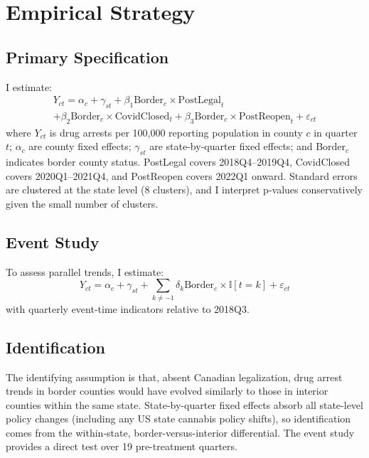 \documentclass[12pt]{article}
\newcommand{\ind}{\mathbb{I}}
\begin{document}



\section{Empirical Strategy}
\label{sec:strategy}

\subsection{Primary Specification}

I estimate:
\begin{multline}
Y_{ct} = \alpha_c + \gamma_{st} + \beta_1 \text{Border}_c \times \text{PostLegal}_t \\
+ \beta_2 \text{Border}_c \times \text{CovidClosed}_t + \beta_3 \text{Border}_c \times \text{PostReopen}_t + \varepsilon_{ct}
\label{eq:main}
\end{multline}
where $Y_{ct}$ is drug arrests per 100,000 reporting population in county $c$ in quarter $t$; $\alpha_c$ are county fixed effects; $\gamma_{st}$ are state-by-quarter fixed effects; and $\text{Border}_c$ indicates border county status. PostLegal covers 2018Q4--2019Q4, CovidClosed covers 2020Q1--2021Q4, and PostReopen covers 2022Q1 onward. Standard errors are clustered at the state level (8 clusters), and I interpret p-values conservatively given the small number of clusters.

\subsection{Event Study}

To assess parallel trends, I estimate:
\begin{equation}
Y_{ct} = \alpha_c + \gamma_{st} + \sum_{k \neq -1} \delta_k \text{Border}_c \times \ind[t = k] + \varepsilon_{ct}
\end{equation}
with quarterly event-time indicators relative to 2018Q3.

\subsection{Identification}

The identifying assumption is that, absent Canadian legalization, drug arrest trends in border counties would have evolved similarly to those in interior counties within the same state. State-by-quarter fixed effects absorb all state-level policy changes (including any US state cannabis policy shifts), so identification comes from the within-state, border-versus-interior differential. The event study provides a direct test over 19 pre-treatment quarters.
\end{document}
